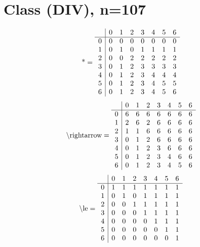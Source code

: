 \documentclass[11pt]{article}
\begin{document}
\section{Class (DIV), n=107}
\[\text{*} = 
\begin{array}{r | r r r r r r r}
 & 0 & 1 & 2 & 3 & 4 & 5 & 6 \\ \hline
0 & 0 & 0 & 0 & 0 & 0 & 0 & 0 \\
1 & 0 & 1 & 0 & 1 & 1 & 1 & 1 \\
2 & 0 & 0 & 2 & 2 & 2 & 2 & 2 \\
3 & 0 & 1 & 2 & 3 & 3 & 3 & 3 \\
4 & 0 & 1 & 2 & 3 & 4 & 4 & 4 \\
5 & 0 & 1 & 2 & 3 & 4 & 5 & 5 \\
6 & 0 & 1 & 2 & 3 & 4 & 5 & 6 \\
\end{array}
\]
\[\text{\textbackslash rightarrow} = 
\begin{array}{r | r r r r r r r}
 & 0 & 1 & 2 & 3 & 4 & 5 & 6 \\ \hline
0 & 6 & 6 & 6 & 6 & 6 & 6 & 6 \\
1 & 2 & 6 & 2 & 6 & 6 & 6 & 6 \\
2 & 1 & 1 & 6 & 6 & 6 & 6 & 6 \\
3 & 0 & 1 & 2 & 6 & 6 & 6 & 6 \\
4 & 0 & 1 & 2 & 3 & 6 & 6 & 6 \\
5 & 0 & 1 & 2 & 3 & 4 & 6 & 6 \\
6 & 0 & 1 & 2 & 3 & 4 & 5 & 6 \\
\end{array}
\]
\[\text{\textbackslash le} = 
\begin{array}{r | r r r r r r r}
 & 0 & 1 & 2 & 3 & 4 & 5 & 6 \\ \hline
0 & 1 & 1 & 1 & 1 & 1 & 1 & 1 \\
1 & 0 & 1 & 0 & 1 & 1 & 1 & 1 \\
2 & 0 & 0 & 1 & 1 & 1 & 1 & 1 \\
3 & 0 & 0 & 0 & 1 & 1 & 1 & 1 \\
4 & 0 & 0 & 0 & 0 & 1 & 1 & 1 \\
5 & 0 & 0 & 0 & 0 & 0 & 1 & 1 \\
6 & 0 & 0 & 0 & 0 & 0 & 0 & 1 \\
\end{array}
\]
\end{document}
